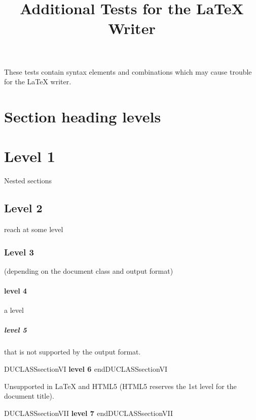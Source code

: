 \documentclass[a4paper]{article}
\newenvironment{DUclass}[1]%
    {%
     \def\DocutilsClassFunctionName{DUCLASS#1}
     \csname \DocutilsClassFunctionName \endcsname}%
    {\csname end\DocutilsClassFunctionName \endcsname}%
\providecommand*{\DUtitle}[1]{%
  \smallskip\noindent\textbf{#1}\smallskip}
\begin{document}
\title{Additional Tests for the LaTeX Writer%
  \label{additional-tests-for-the-latex-writer}}
\author{}
\date{}
\maketitle

These tests contain syntax elements and combinations which may cause
trouble for the LaTeX writer.

\label{contents}
\tableofcontents


\section{Section heading levels%
  \label{section-heading-levels}%
}


\section{Level 1%
  \label{level-1}%
}

Nested sections


\subsection{Level 2%
  \label{level-2}%
}

reach at some level


\subsubsection{Level 3%
  \label{level-3}%
}

(depending on the document class and output format)


\paragraph{level 4%
  \label{level-4}%
}

a level


\subparagraph{level 5%
  \label{level-5}%
}

that is not supported by the output format.


\begin{DUclass}{sectionVI}
\DUtitle{level 6%
  \label{level-6}%
}
\end{DUclass}

Unsupported in LaTeX and HTML5
(HTML5 reserves the 1st level for the document title).


\begin{DUclass}{sectionVII}
\DUtitle{level 7%
  \label{level-7}%
}
\end{DUclass}
\end{document}
